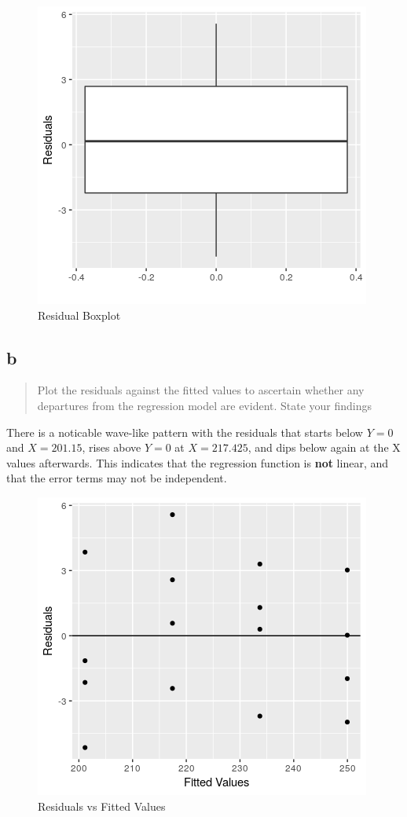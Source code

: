 \documentclass[11pt]{article}
\begin{document}
\begin{figure}[htbp]
\centering
\includegraphics[width=.9\linewidth]{./images/3.6a.png}
\caption{Residual Boxplot}
\end{figure}

\subsection{b}
\label{sec:org4b8d097}
\begin{quote}
Plot the residuals against the fitted values to ascertain whether any departures
from the regression model are evident. State your findings
\end{quote}

There is a noticable wave-like pattern with the residuals that starts below \(Y =
0\) and \(X = 201.15\), rises above \(Y = 0\) at \(X = 217.425\), and dips below again
at the X values afterwards. This indicates that the regression function is \textbf{not}
linear, and that the error terms may not be independent.

\begin{figure}[htbp]
\centering
\includegraphics[width=.9\linewidth]{./images/3.6b.png}
\caption{\label{fig:org7998d56}
Residuals vs Fitted Values}
\end{figure}
\end{document}
